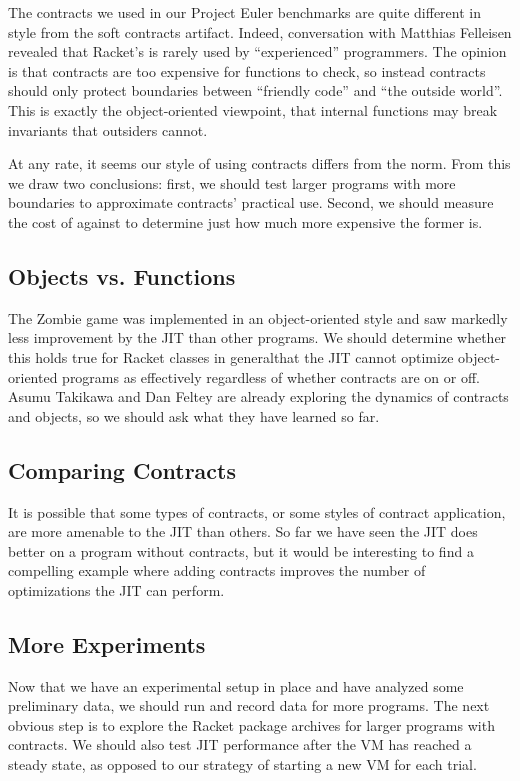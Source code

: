 The contracts we used in our Project Euler benchmarks are quite different in style from the soft contracts artifact.
Indeed, conversation with Matthias Felleisen revealed that Racket's  is rarely used by ``experienced'' programmers.
The opinion is that contracts are too expensive for functions to check, so instead contracts should only protect boundaries between ``friendly code'' and ``the outside world''.
This is exactly the object-oriented viewpoint, that internal functions may break invariants that outsiders cannot.

At any rate, it seems our style of using contracts differs from the norm.
From this we draw two conclusions: first, we should test larger programs with more boundaries to approximate contracts' practical use.
Second, we should measure the cost of  against  to determine just how much more expensive the former is.

\subsection{Objects vs. Functions}

The Zombie game was implemented in an object-oriented style and saw markedly less improvement by the JIT than other programs.
We should determine whether this holds true for Racket classes in general\textemdash that the JIT cannot optimize object-oriented programs as effectively regardless of whether contracts are on or off.
Asumu Takikawa and Dan Feltey are already exploring the dynamics of contracts and objects, so we should ask what they have learned so far.

\subsection{Comparing Contracts}
It is possible that some types of contracts, or some styles of contract application, are more amenable to the JIT than others.
So far we have seen the JIT does better on a program without contracts, but it would be interesting to find a compelling example where adding contracts improves the number of optimizations the JIT can perform.

\subsection{More Experiments}

Now that we have an experimental setup in place and have analyzed some preliminary data, we should run and record data for more programs.
The next obvious step is to explore the Racket package archives for larger programs with contracts.
We should also test JIT performance after the VM has reached a steady state, as opposed to our strategy of starting a new VM for each trial.

